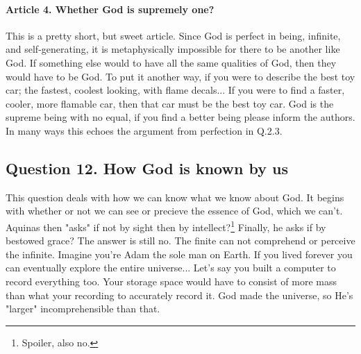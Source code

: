 \documentclass{ucetd}
\begin{document}
\paragraph{Article 4. Whether God is supremely one?}
This is a pretty short, but sweet article. Since God is perfect in being, infinite, and self-generating, it is metaphysically impossible for there to be another like God. If something else would to have all the same qualities of God, then they would have to be God. To put it another way, if you were to describe the best toy car; the fastest, coolest looking, with flame decals... If you were to find a faster, cooler, more flamable car, then that car must be the best toy car. God is the supreme being with no equal, if you find a better being please inform the authors. In many ways this echoes the argument from perfection in Q.2.3. 


\subsection{Question 12. How God is known by us}
This question deals with how we can know what we know about God. It begins with whether or not we can see or precieve the essence of God, which we can't. Aquinas then "asks" if not by sight then by intellect?\footnote{Spoiler, also no.} Finally, he asks if by bestowed grace? The answer is still no. The finite can not comprehend or perceive the infinite. Imagine you're Adam the sole man on Earth. If you lived forever you can eventually explore the entire universe... Let's say you built a computer to record everything too. Your storage space would have to consist of more mass than what your recording to accurately record it. God made the universe, so He's "larger" incomprehensible than that.
\end{document}
